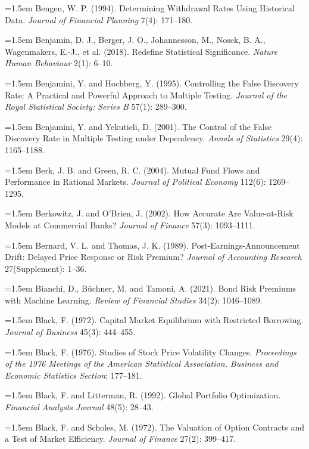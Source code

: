\hangindent=1.5em Bengen, W. P. (1994). Determining Withdrawal Rates Using Historical Data. \emph{Journal of Financial Planning} 7(4): 171--180.

\hangindent=1.5em Benjamin, D. J., Berger, J. O., Johannesson, M., Nosek, B. A., Wagenmakers, E.-J., et al. (2018). Redefine Statistical Significance. \emph{Nature Human Behaviour} 2(1): 6--10.

\hangindent=1.5em Benjamini, Y. and Hochberg, Y. (1995). Controlling the False Discovery Rate: A Practical and Powerful Approach to Multiple Testing. \emph{Journal of the Royal Statistical Society: Series B} 57(1): 289--300.

\hangindent=1.5em Benjamini, Y. and Yekutieli, D. (2001). The Control of the False Discovery Rate in Multiple Testing under Dependency. \emph{Annals of Statistics} 29(4): 1165--1188.

\hangindent=1.5em Berk, J. B. and Green, R. C. (2004). Mutual Fund Flows and Performance in Rational Markets. \emph{Journal of Political Economy} 112(6): 1269--1295.

\hangindent=1.5em Berkowitz, J. and O'Brien, J. (2002). How Accurate Are Value-at-Risk Models at Commercial Banks? \emph{Journal of Finance} 57(3): 1093--1111.

\hangindent=1.5em Bernard, V. L. and Thomas, J. K. (1989). Post-Earnings-Announcement Drift: Delayed Price Response or Risk Premium? \emph{Journal of Accounting Research} 27(Supplement): 1--36.

\hangindent=1.5em Bianchi, D., B\"uchner, M. and Tamoni, A. (2021). Bond Risk Premiums with Machine Learning. \emph{Review of Financial Studies} 34(2): 1046--1089.

\hangindent=1.5em Black, F. (1972). Capital Market Equilibrium with Restricted Borrowing. \emph{Journal of Business} 45(3): 444--455.

\hangindent=1.5em Black, F. (1976). Studies of Stock Price Volatility Changes. \emph{Proceedings of the 1976 Meetings of the American Statistical Association, Business and Economic Statistics Section}: 177--181.

\hangindent=1.5em Black, F. and Litterman, R. (1992). Global Portfolio Optimization. \emph{Financial Analysts Journal} 48(5): 28--43.

\hangindent=1.5em Black, F. and Scholes, M. (1972). The Valuation of Option Contracts and a Test of Market Efficiency. \emph{Journal of Finance} 27(2): 399--417.

